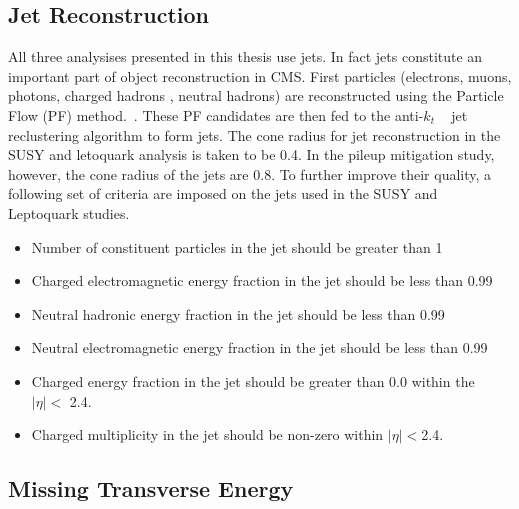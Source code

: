 \subsection{Jet Reconstruction}

All three analysises presented in this thesis use jets. In fact jets constitute an important part of object reconstruction in CMS. First particles 
 (electrons, muons, photons, charged hadrons , neutral hadrons) are reconstructed using the Particle Flow (PF) method.~\cite{PFmethod}. These PF candidates are then fed to the anti-$k_{t}$ ~\cite{antiKT} jet reclustering algorithm to form jets. The cone radius for jet reconstruction in the SUSY and letoquark analysis is taken to be 0.4. In the pileup mitigation study, however, the cone radius of the jets are 0.8.  To further improve their quality, a following set of criteria are imposed on the jets used in the SUSY and Leptoquark studies.

\begin{itemize}
\item Number of constituent particles in the jet should be greater than 1 \vspace{-0.2in}
\item Charged electromagnetic energy fraction in the jet should be less than 0.99 \vspace{-0.2in}

\item Neutral hadronic energy fraction in the jet should be less than 0.99 \vspace{-0.2in}

\item  Neutral electromagnetic energy fraction in the jet should be less than 0.99 \vspace{-0.2in}

\item Charged energy fraction in the jet should be greater than 0.0 within the $|\eta| < $ 2.4. \vspace{-0.2in}

\item Charged multiplicity in the jet should be non-zero within $|\eta| < $2.4.

\end{itemize}


\subsection{Missing Transverse Energy}

